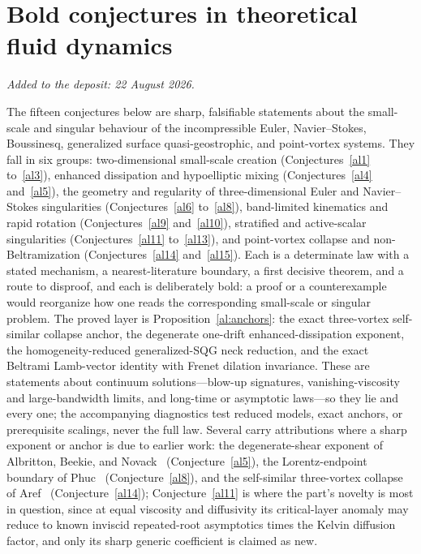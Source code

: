 \documentclass[11pt]{article}
\theoremstyle{definition}
\begin{document}
\part{Bold conjectures in theoretical fluid dynamics}

\medskip\noindent\emph{Added to the deposit: 22 August 2026.}\par\medskip

The fifteen conjectures below are sharp, falsifiable statements about the small-scale and singular behaviour of the incompressible Euler, Navier--Stokes, Boussinesq, generalized surface quasi-geostrophic, and point-vortex systems.  They fall in six groups: two-dimensional small-scale creation (Conjectures~\ref{al1} to~\ref{al3}), enhanced dissipation and hypoelliptic mixing (Conjectures~\ref{al4} and~\ref{al5}), the geometry and regularity of three-dimensional Euler and Navier--Stokes singularities (Conjectures~\ref{al6} to~\ref{al8}), band-limited kinematics and rapid rotation (Conjectures~\ref{al9} and~\ref{al10}), stratified and active-scalar singularities (Conjectures~\ref{al11} to~\ref{al13}), and point-vortex collapse and non-Beltramization (Conjectures~\ref{al14} and~\ref{al15}).  Each is a determinate law with a stated mechanism, a nearest-literature boundary, a first decisive theorem, and a route to disproof, and each is deliberately bold: a proof or a counterexample would reorganize how one reads the corresponding small-scale or singular problem.  The proved layer is Proposition~\ref{al:anchors}: the exact three-vortex self-similar collapse anchor, the degenerate one-drift enhanced-dissipation exponent, the homogeneity-reduced generalized-SQG neck reduction, and the exact Beltrami Lamb-vector identity with Frenet dilation invariance.  These are statements about continuum solutions---blow-up signatures, vanishing-viscosity and large-bandwidth limits, and long-time or asymptotic laws---so they lie and every one; the accompanying diagnostics test reduced models, exact anchors, or prerequisite scalings, never the full law.  Several carry attributions where a sharp exponent or anchor is due to earlier work: the degenerate-shear exponent of Albritton, Beekie, and Novack~\cite{ABN22} (Conjecture~\ref{al5}), the Lorentz-endpoint boundary of Phuc~\cite{Phuc15} (Conjecture~\ref{al8}), and the self-similar three-vortex collapse of Aref~\cite{Aref10} (Conjecture~\ref{al14}); Conjecture~\ref{al11} is where the part's novelty is most in question, since at equal viscosity and diffusivity its critical-layer anomaly may reduce to known inviscid repeated-root asymptotics times the Kelvin diffusion factor, and only its sharp generic coefficient is claimed as new.
\end{document}

